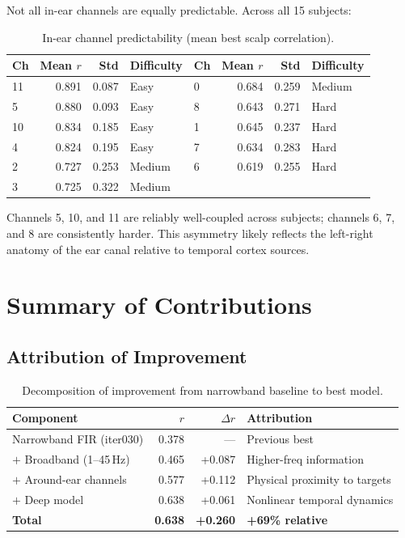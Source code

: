 \documentclass[11pt,a4paper]{article}
\begin{document}
Not all in-ear channels are equally predictable. Across all 15 subjects:

\begin{table}[H]
\centering
\caption{In-ear channel predictability (mean best scalp correlation).}
\begin{tabular}{lrrl|lrrl}
\toprule
Ch & Mean $r$ & Std & Difficulty & Ch & Mean $r$ & Std & Difficulty \\
\midrule
11 & 0.891 & 0.087 & Easy & 0 & 0.684 & 0.259 & Medium \\
5 & 0.880 & 0.093 & Easy & 8 & 0.643 & 0.271 & Hard \\
10 & 0.834 & 0.185 & Easy & 1 & 0.645 & 0.237 & Hard \\
4 & 0.824 & 0.195 & Easy & 7 & 0.634 & 0.283 & Hard \\
2 & 0.727 & 0.253 & Medium & 6 & 0.619 & 0.255 & Hard \\
3 & 0.725 & 0.322 & Medium & & & & \\
\bottomrule
\end{tabular}
\end{table}

Channels 5, 10, and 11 are reliably well-coupled across subjects;
channels 6, 7, and 8 are consistently harder. This asymmetry likely
reflects the left-right anatomy of the ear canal relative to temporal
cortex sources.

\section{Summary of Contributions}

\subsection{Attribution of Improvement}

\begin{table}[H]
\centering
\caption{Decomposition of improvement from narrowband baseline to best model.}
\begin{tabular}{lrrl}
\toprule
Component & $r$ & $\Delta r$ & Attribution \\
\midrule
Narrowband FIR (iter030) & 0.378 & --- & Previous best \\
$+$ Broadband (1--45\,Hz) & 0.465 & +0.087 & Higher-freq information \\
$+$ Around-ear channels & 0.577 & +0.112 & Physical proximity to targets \\
$+$ Deep model & 0.638 & +0.061 & Nonlinear temporal dynamics \\
\midrule
\textbf{Total} & \textbf{0.638} & \textbf{+0.260} & \textbf{+69\% relative} \\
\bottomrule
\end{tabular}
\end{table}
\end{document}
